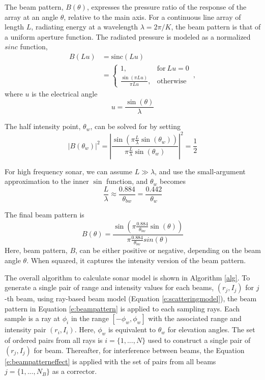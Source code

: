 \documentclass[utf8]{frontiersSCNS} %
\begin{document}
 
The beam pattern, $B(\theta)$, expresses the pressure ratio of the response of the array at an angle $\theta$, relative to the main axis.  For a continuous line array of length $L$, radiating energy at a wavelength $\lambda=2\pi/K$, the beam pattern is that of a uniform aperture function. The radiated pressure is modeled as a normalized $sinc$ function,
\begin{align}
    B(Lu)&= \textrm{sinc}(Lu) \\ 
    &= \begin{cases}
      1, & \mathrm{for}\: Lu = 0 \\
       \frac{\sin(\pi L u)}{\pi L u}, & \mathrm{otherwise} \nonumber
    \end{cases}\, ,
\end{align}
where $u$ is the electrical angle
\begin{equation}
    u = \frac{\sin(\theta)}{\lambda}
\end{equation}

The half intensity point, $\theta_w$, can be solved for by setting
\begin{equation}
    |B(\theta_w)|^2 = \left|\frac{\sin\left(\pi\frac{L}{\lambda}\sin(\theta_w)\right)}{\pi\frac{L}{\lambda}\sin(\theta_w)}\right|^2 = \frac{1}{2}    
\end{equation}

For high frequency sonar, we can assume $L \gg \lambda$, and use the small-argument approximation to the inner $\sin$ function, and $\theta_w$ becomes 
\begin{equation}
    \frac{L}{\lambda} \approx \frac{0.884}{\theta_{bw}} = \frac{0.442}{\theta_w}
\end{equation}

The final beam pattern is 
\begin{equation}
    B(\theta) = \frac{\sin\left(\pi\frac{0.884}{\theta_{bw}}\sin(\theta)\right)}{\pi \frac{0.884}{\theta_{bw}}sin(\theta)}
    \label{e:beampattern}
\end{equation}
Here, beam pattern, $B$, can be either positive or negative, depending on the beam angle $\theta$. When squared, it captures the intensity version of the beam pattern. 

The overall algorithm to calculate sonar model is shown in Algorithm \ref{alg}. To generate a single pair of range and intensity values for each beams, $(r_j,I_j)$ for $j$-th beam, using ray-based beam model (Equation \ref{e:scatteringmodel}), the beam pattern in Equation \ref{e:beampattern} is applied to each sampling rays. Each sample is a ray at $\phi_i$ in the range $[-\phi_w, \phi_w]$ with the associated range and intensity pair $(r_i, I_i)$. Here, $\phi_w$ is equivalent to $\theta_w$ for elevation angles. The set of ordered pairs from all rays is $i=\{1,...,N\}$ used to construct a single pair of $(r_j,I_j)$ for beam. Thereafter, for interference between beams, the Equation \ref{e:beampatterneffect} is applied with the set of pairs from all beams $j=\{1,...,N_B\}$ as a corrector.
\end{document}
